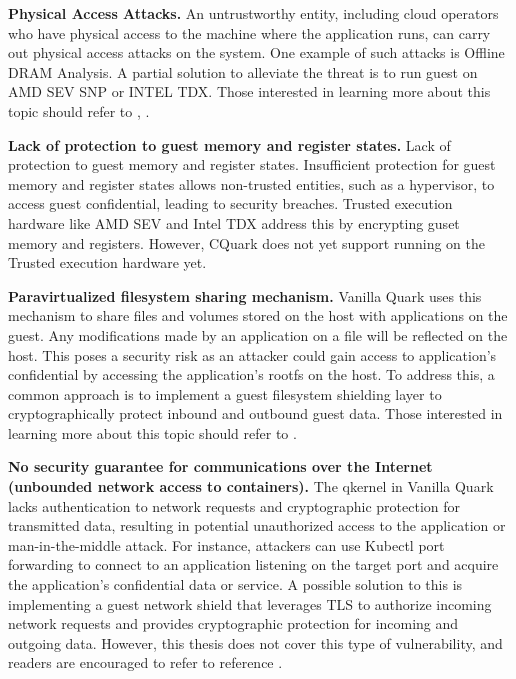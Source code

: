 \textbf{Physical Access Attacks.} An untrustworthy entity, including cloud operators who have physical access to the machine where the application runs, can carry out physical access attacks on the system. One example of such attacks 
is Offline DRAM Analysis. A partial solution to alleviate the threat is to run guest on AMD SEV SNP or INTEL TDX.  Those interested in learning more about this topic should refer to \cite*{SEV_SNP_white_book}, \cite*{Cheng_Ozga_Valdez_Ahmed_Gu_Jamjoom_Franke_Bottomley_2023}.


\textbf{Lack of protection to guest memory and register states.} Lack of protection to guest memory and register states.  Insufficient protection for guest memory and register states allows non-trusted entities, such as a hypervisor, to access guest confidential, leading to security breaches. 
Trusted execution hardware like AMD SEV\cite*{SEV_SNP_white_book} and Intel TDX\cite*{INTELTXD} address this by encrypting guset memory and registers. However, CQuark does not yet support running on the Trusted execution hardware yet.


\textbf{Paravirtualized filesystem sharing mechanism.} Vanilla Quark uses this mechanism to share files and volumes stored on the host with applications on the guest. Any modifications made by an application on a file will be reflected on the host. This poses a security risk as an attacker could 
gain access to application’s confidential by accessing the application's rootfs on the host. To address this, a common approach is to implement a guest filesystem shielding layer to cryptographically protect inbound and outbound guest data. Those interested in learning more about this topic should 
refer to \cite*{file_system_shield}.


\textbf{No security guarantee for communications over the Internet (unbounded network access to containers).} The qkernel in Vanilla Quark lacks authentication to network requests and cryptographic protection for transmitted data, resulting in potential unauthorized access to the application or 
man-in-the-middle attack\cite*{Man_in_the_middle_attack}. For instance, attackers can use Kubectl port forwarding to connect to an application listening on the target port and acquire the application’s confidential data or service. A possible solution to this is implementing a guest network shield that leverages TLS to authorize 
incoming network requests and provides cryptographic protection for incoming and outgoing data. However, this thesis does not cover this type of vulnerability, and readers are encouraged to refer to reference \cite*{network_shiled}.

